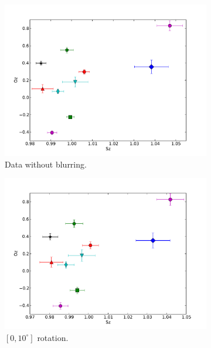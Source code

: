 \begin{figure}
\centering
\begin{subfigure}[b]{.25\textwidth}
  \centering
  \includegraphics[width=\textwidth, trim={.9cm .5cm 1.8cm 1.3cm},clip]{figs/sz-oz.pdf}
  \caption{Data without blurring.}
  \label{fig:sub1}
\end{subfigure}%
\begin{subfigure}[b]{.25\textwidth}
  \centering
  \includegraphics[width=\textwidth, trim={.9cm .5cm 1.8cm 1.3cm},clip]{figs/sz-oz-rand10.pdf}
  \caption{$[0, 10^{\circ}]$ rotation.}
  \label{fig:sub2}
\end{subfigure}%
\begin{subfigure}[b]{.25\textwidth}
  \centering

\end{subfigure}
\end{figure}

